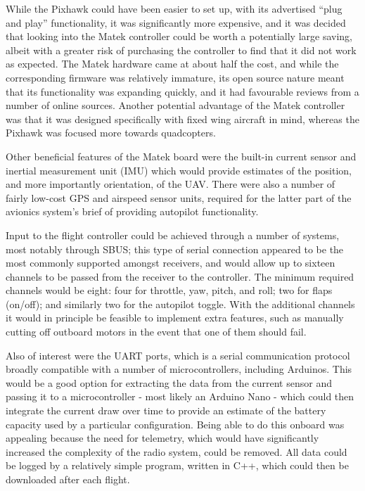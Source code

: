 \documentclass[../../main.tex]{subfiles}
\begin{document}
While the Pixhawk could have been easier to set up, with its advertised “plug and play” functionality, it was significantly more expensive, and it was decided that looking into the Matek controller could be worth a potentially large saving, albeit with a greater risk of purchasing the controller to find that it did not work as expected.
The Matek hardware came at about half the cost, and while the corresponding firmware was relatively immature, its open source nature meant that its functionality was expanding quickly, and it had favourable reviews from a number of online sources.
Another potential advantage of the Matek controller was that it was designed specifically with fixed wing aircraft in mind, whereas the Pixhawk was focused more towards quadcopters. 


Other beneficial features of the Matek board were the built-in current sensor and inertial measurement unit (IMU) which would provide estimates of the position, and more importantly orientation, of the UAV.
There were also a number of fairly low-cost GPS and airspeed sensor units, required for the latter part of the avionics system’s brief of providing autopilot functionality. 


Input to the flight controller could be achieved through a number of systems, most notably through SBUS; this type of serial connection appeared to be the most commonly supported amongst receivers, and would allow up to sixteen channels to be passed from the receiver to the controller.
The minimum required channels would be eight: four for throttle, yaw, pitch, and roll; two for flaps (on/off); and similarly two for the autopilot toggle.
With the additional channels it would in principle be feasible to implement extra features, such as manually cutting off outboard motors in the event that one of them should fail. 

Also of interest were the UART ports, which is a serial communication protocol broadly compatible with a number of microcontrollers, including Arduinos.
This would be a good option for extracting the data from the current sensor and passing it to a microcontroller - most likely an Arduino Nano - which could then integrate the current draw over time to provide an estimate of the battery capacity used by a particular configuration.
Being able to do this onboard was appealing because the need for telemetry, which would have significantly increased the complexity of the radio system, could be removed.
All data could be logged by a relatively simple program, written in C++, which could then be downloaded after each flight. 
\end{document}
